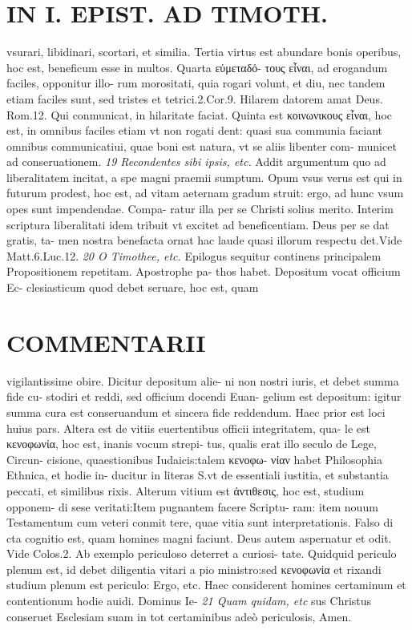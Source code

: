 \documentclass{article}
\begin{document}
\begin{pages}
\section*{IN I. EPIST. AD TIMOTH. }
\marginpar{[ p.169 ]}\pstart vsurari, libidinari, scortari, et similia. Tertia virtus est abundare bonis operibus, hoc est, beneficum esse in multos. Quarta εὐμεταδό- τους εἶναι, ad erogandum faciles, opponitur illo- rum morositati, quia rogari volunt, et diu, nec tandem etiam faciles sunt, sed tristes et tetrici.2.Cor.9. Hilarem datorem amat Deus. Rom.12. Qui conmunicat, in hilaritate faciat. Quinta est κοινωνικους εἶναι, hoc est, in omnibus faciles etiam vt non rogati dent: quasi sua communia faciant omnibus communicatiui, quae boni est natura, vt se aliis libenter com- municet ad conseruationem.  \pend
\textit{19 Recondentes sibi ipsis, etc. }\pstart Addit argumentum quo ad liberalitatem incitat, a spe magni praemii sumptum. Opum vsus verus est qui in futurum prodest, hoc est, ad vitam aeternam gradum struit: ergo, ad hunc vsum opes sunt impendendae. Compa- ratur illa per se Christi solius merito. Interim scriptura liberalitati idem tribuit vt excitet ad beneficentiam. Deus per se dat gratis, ta- men nostra benefacta ornat hac laude quasi illorum respectu det.Vide Matt.6.Luc.12.  \pend
\textit{20 O Timothee, etc. }\pstart Epilogus sequitur continens principalem Propositionem repetitam. Apostrophe pa- thos habet. Depositum vocat officium Ec- clesiasticum quod debet seruare, hoc est, quam  \pend
\marginpar{[ p.170 ]}
\section*{COMMENTARII }\pstart vigilantissime obire. Dicitur depositum alie- ni non nostri iuris, et debet summa fide cu- stodiri et reddi, sed officium docendi Euan- gelium est depositum: igitur summa cura est conseruandum et sincera fide reddendum. Haec prior est loci huius pars. Altera est de vitiis euertentibus officii integritatem, qua- le est κενοφωνία, hoc est, inanis vocum strepi- tus, qualis erat illo seculo de Lege, Circun- cisione, quaestionibus Iudaicis:talem κενοφω- νίαν habet Philosophia Ethnica, et hodie in- ducitur in literas S.vt de essentiali iustitia, et substantia peccati, et similibus rixis. Alterum vitium est ἀντιθεσις, hoc est, studium opponem- di sese veritati:Item pugnantem facere Scriptu- ram: item nouum Testamentum cum veteri conmit tere, quae vitia sunt interpretationis. Falso di cta cognitio est, quam homines magni faciunt. Deus autem aspernatur et odit. Vide Colos.2. Ab exemplo periculoso deterret a curiosi- tate. Quidquid periculo plenum est, id debet diligentia vitari a pio ministro:sed κενοφωνία et rixandi studium plenum est periculo: Ergo, etc. Haec considerent homines certaminum et contentionum hodie auidi. Dominus Ie-  \pend
\textit{21 Quam quidam, etc }\pstart sus Christus conseruet Esclesiam suam in tot certaminibus adeò periculosis, Amen.  \pend
\end{pages}
\end{document}
